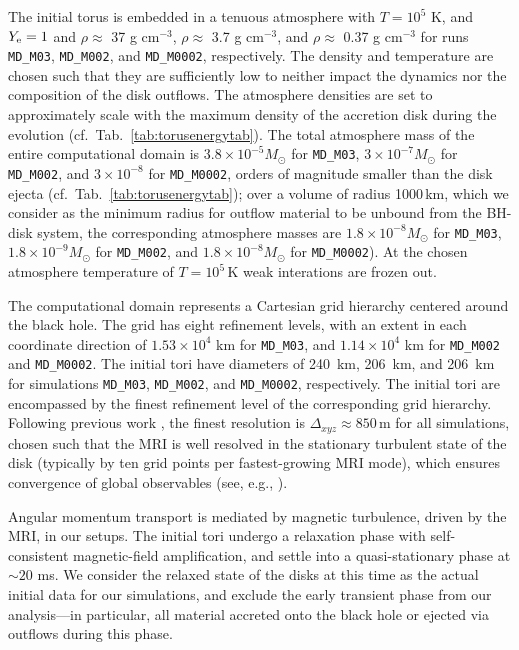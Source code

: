 The initial torus is embedded in a tenuous atmosphere with $T = 10^5$ K, and $Y_{\rm e} = 1$ and $\rho \approx$ 37 g cm$^{-3}$, $\rho \approx$ 3.7 g cm$^{-3}$, and $\rho \approx$ 0.37 g cm$^{-3}$ for runs \texttt{MD\_M03}, \texttt{MD\_M002}, and \texttt{MD\_M0002}, respectively. The density and temperature are chosen such that they are sufficiently low to neither impact the dynamics nor the composition of the disk outflows. The atmosphere densities are set to approximately scale with the maximum density of the accretion disk during the evolution (cf.~Tab.~\ref{tab:torusenergytab}). The total atmosphere mass of the entire computational domain is $3.8\times 10^{-5} M_\odot$ for \texttt{MD\_M03}, $3\times 10^{-7} M_\odot$ for \texttt{MD\_M002}, and $3\times 10^{-8}$ for \texttt{MD\_M0002}, orders of magnitude smaller than the disk ejecta (cf.~Tab.~\ref{tab:torusenergytab}); over a volume of radius 1000\,km, which we consider as the minimum radius for outflow material to be unbound from the BH-disk system, the corresponding atmosphere masses are $1.8\times 10^{-8} M_\odot$ for \texttt{MD\_M03}, $1.8\times 10^{-9} M_\odot$ for \texttt{MD\_M002}, and $1.8\times 10^{-8} M_\odot$ for \texttt{MD\_M0002}). At the chosen atmosphere temperature of $T = 10^5$\,K weak interations are frozen out.

The computational domain represents a Cartesian grid hierarchy centered around the black hole. The grid has eight refinement levels, with an extent in each coordinate direction of $1.53\times 10^4$ km for \texttt{MD\_M03}, and $1.14\times 10^4$ km for \texttt{MD\_M002} and \texttt{MD\_M0002}. The initial tori have diameters of 240~km, 206~km, and 206~km for simulations \texttt{MD\_M03}, \texttt{MD\_M002}, and \texttt{MD\_M0002}, respectively. The initial tori are encompassed by the finest refinement level of the corresponding grid hierarchy. Following previous work \cite{siegel_magnetorotational_2013,Siegel:2017jug,siegel_collapsars_2019}, the finest resolution is $\Delta_{xyz} \approx 850$\,m for all simulations, chosen such that the MRI is well resolved in the stationary turbulent state of the disk (typically by ten grid points per fastest-growing MRI mode), which ensures convergence of global observables (see, e.g., \cite{siegel_collapsars_2019}).

Angular momentum transport is mediated by magnetic turbulence, driven by the MRI, in our setups. The initial tori undergo a relaxation phase with self-consistent magnetic-field amplification, and settle into a quasi-stationary phase at $\sim\!20$ ms. We consider the relaxed state of the disks at this time as the actual initial data for our simulations, and exclude the early transient phase from our analysis---in particular, all material accreted onto the black hole or ejected via outflows during this phase.

